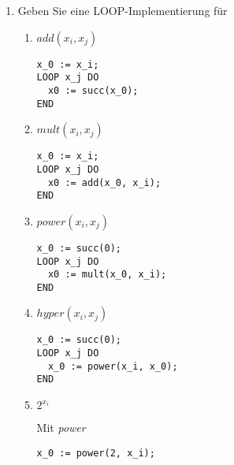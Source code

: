 \documentclass{bschlangaul-aufgabe}
\begin{document}
\begin{enumerate}
\item Geben Sie eine LOOP-Implementierung für

\begin{enumerate}

%

\item $add(x_i, x_j)$

\begin{bAntwort}
\begin{verbatim}
x_0 := x_i;
LOOP x_j DO
  x0 := succ(x_0);
END
\end{verbatim}
\end{bAntwort}

%

\item $mult(x_i, x_j)$

\begin{bAntwort}
\begin{verbatim}
x_0 := x_i;
LOOP x_j DO
  x0 := add(x_0, x_i);
END
\end{verbatim}
\end{bAntwort}

%

\item $power(x_i, x_j)$

\begin{bAntwort}
\begin{verbatim}
x_0 := succ(0);
LOOP x_j DO
  x0 := mult(x_0, x_i);
END
\end{verbatim}
\end{bAntwort}

%

\item $hyper(x_i, x_j)$

\begin{bAntwort}
\begin{verbatim}
x_0 := succ(0);
LOOP x_j DO
  x_0 := power(x_i, x_0);
END
\end{verbatim}
\end{bAntwort}

\item $2^{x_i}$

\begin{bAntwort}
Mit \emph{power}

\begin{verbatim}
x_0 := power(2, x_i);
\end{verbatim}


\end{bAntwort}
\end{enumerate}
\end{enumerate}
\end{document}
